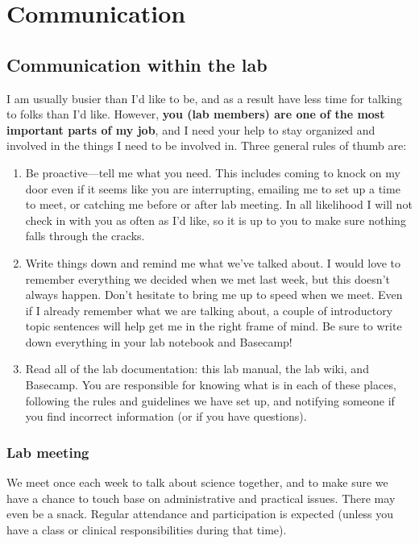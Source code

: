 \documentclass[letterpaper,12pt,oneside]{memoir}
\begin{document}
\chapter{Communication}
\section{Communication within the lab}
\label{sec:communicationInLab}

I am usually busier than I'd like to be, and as a result have less time for talking to folks than I'd like. However, \textbf{you (lab members) are one of the most important parts of my job}, and I need your help to stay organized and involved in the things I need to be involved in. Three general rules of thumb are:

\begin{enumerate}
\item Be proactive---tell me what you need. This includes coming to knock on my door even if it seems like you are interrupting, emailing me to set up a time to meet, or catching me before or after lab meeting. In all likelihood I will not check in with you as often as I'd like, so it is up to you to make sure nothing falls through the cracks.

\item Write things down and remind me what we've talked about. I would love to remember everything we decided when we met last week, but this doesn't always happen. Don't hesitate to bring me up to speed when we meet. Even if I already remember what we are talking about, a couple of introductory topic sentences will help get me in the right frame of mind. Be sure to write down everything in your lab notebook and Basecamp!

\item Read all of the lab documentation: this lab manual, the lab wiki, and Basecamp. You are responsible for knowing what is in each of these places, following the rules and guidelines we have set up, and notifying someone if you find incorrect information (or if you have questions).
\end{enumerate}

\subsection{Lab meeting}
We meet once each week to talk about science together, and to make sure we have a chance to touch base on administrative and practical issues. There may even be a snack. Regular attendance and participation is expected (unless you have a class or clinical responsibilities during that time).
\end{document}
